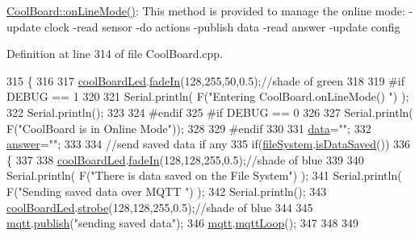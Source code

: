 \hyperlink{class_cool_board_aa0bbc4bc605e35618d18e68795c61363}{Cool\+Board\+::on\+Line\+Mode()}\+: This method is provided to manage the online mode\+: -\/update clock -\/read sensor -\/do actions -\/publish data -\/read answer -\/update config 

Definition at line 314 of file Cool\+Board.\+cpp.


\begin{DoxyCode}
315 \{
316 
317     \hyperlink{class_cool_board_a1b1d3c684a5baa56b08486e192fd8e97}{coolBoardLed}.\hyperlink{class_cool_board_led_ab778f5e7bed0ab74e3906d82110493c3}{fadeIn}(128,255,50,0.5);\textcolor{comment}{//shade of green}
318 
319 \textcolor{preprocessor}{#if DEBUG == 1}
320 
321     Serial.println( F(\textcolor{stringliteral}{"Entering CoolBoard.onLineMode() "}) );
322     Serial.println();
323 
324 \textcolor{preprocessor}{#endif}
325 \textcolor{preprocessor}{#if DEBUG == 0}
326 
327     Serial.println( F(\textcolor{stringliteral}{"CoolBoard is in Online Mode"}));
328 
329 \textcolor{preprocessor}{#endif}
330 
331     \hyperlink{class_cool_board_a427fb753dd8575bdf821c70a5c63d695}{data}=\textcolor{stringliteral}{""};
332     \hyperlink{class_cool_board_a7b835fafd449e5282f7f91d787a2dc15}{answer}=\textcolor{stringliteral}{""};
333 
334     \textcolor{comment}{//send saved data if any}
335     \textcolor{keywordflow}{if}(\hyperlink{class_cool_board_a42c2586fbb13ff7f06538e9284e8538d}{fileSystem}.\hyperlink{class_cool_file_system_ac86a40e7c3a1842f7342f698d34324f9}{isDataSaved}())
336     \{
337 
338         \hyperlink{class_cool_board_a1b1d3c684a5baa56b08486e192fd8e97}{coolBoardLed}.\hyperlink{class_cool_board_led_ab778f5e7bed0ab74e3906d82110493c3}{fadeIn}(128,128,255,0.5);\textcolor{comment}{//shade of blue}
339 
340         Serial.println( F(\textcolor{stringliteral}{"There is data saved on the File System"}) );
341         Serial.println( F(\textcolor{stringliteral}{"Sending saved data over MQTT "}) );
342         Serial.println();
343         \hyperlink{class_cool_board_a1b1d3c684a5baa56b08486e192fd8e97}{coolBoardLed}.\hyperlink{class_cool_board_led_ad5f0de4c628cbfbf49896042831c64ad}{strobe}(128,128,255,0.5);\textcolor{comment}{//shade of blue }
344 
345         \hyperlink{class_cool_board_a2399f44d7c23c1149a335cb3b46d90f1}{mqtt}.\hyperlink{class_cool_m_q_t_t_ace977b3e90ab14b1199fe5c4fb0a13ec}{publish}(\textcolor{stringliteral}{"sending saved data"});
346         \hyperlink{class_cool_board_a2399f44d7c23c1149a335cb3b46d90f1}{mqtt}.\hyperlink{class_cool_m_q_t_t_aa5eaae967b562b62cbcf2b8d81f6e5d5}{mqttLoop}();
347 
348 
349         

\end{DoxyCode}
